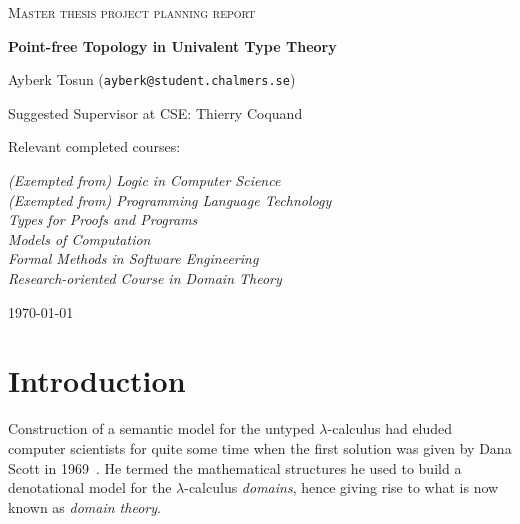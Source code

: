 \documentclass{article}
\begin{document}
\begin{titlepage}

\centering
  
{\scshape\LARGE Master thesis project planning report\\}
  
\vspace{0.5cm}
  
{\huge\bfseries Point-free Topology in Univalent Type Theory\\}
  
\vspace{2cm}

{\Large Ayberk Tosun (\texttt{ayberk@student.chalmers.se})\\}
  
\vspace{1.0cm}
  
{\large Suggested Supervisor at CSE: Thierry Coquand\\}
  
\vspace{1.5cm}
  
{\large Relevant completed courses:\\}
  
{\itshape (Exempted from) Logic in Computer Science\\}
{\itshape (Exempted from) Programming Language Technology\\}
{\itshape Types for Proofs and Programs\\}
{\itshape Models of Computation\\}
{\itshape Formal Methods in Software Engineering\\}
{\itshape Research-oriented Course in Domain Theory\\}
  
\vfill

\vfill
  
{\large \today\\} 

\end{titlepage}

\section{Introduction}

Construction of a semantic model for the untyped $\lambda$-calculus had eluded computer
scientists for quite some time when the first solution was given by Dana Scott in
1969~\cite{scott:1969}. He termed the mathematical structures he used to build a
denotational model for the $\lambda$-calculus \emph{domains}, hence giving rise to what is now
known as \emph{domain theory}.
\end{document}
